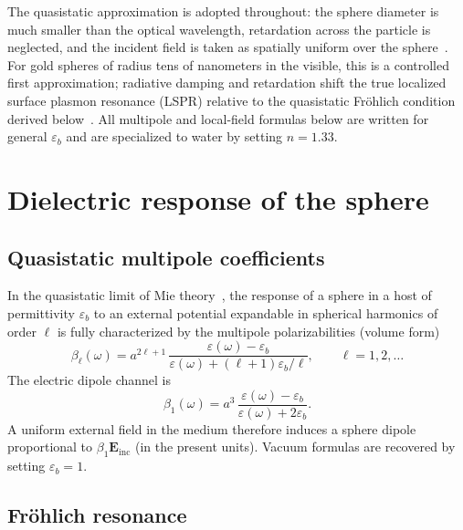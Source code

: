 \documentclass[11pt,a4paper]{article}
\begin{document}
\noindent
The quasistatic approximation is adopted throughout: the sphere diameter is much
smaller than the optical wavelength, retardation across the particle is neglected,
and the incident field is taken as spatially uniform over the sphere~\citep{bohren1983,novotny2012}.
For gold spheres of radius tens of nanometers in the visible, this is a controlled first
approximation; radiative damping and retardation shift the true localized surface
plasmon resonance (LSPR) relative to the quasistatic Fr\"{o}hlich condition derived
below~\citep{maier2007,bohren1983}.  All multipole and local-field formulas below are written for general
$\varepsilon_b$ and are specialized to water by setting $n=1.33$.

\section{Dielectric response of the sphere}
\label{sec:sphere}

\subsection{Quasistatic multipole coefficients}

In the quasistatic limit of Mie theory~\citep{mie1908,bohren1983}, the response of a sphere in a host of permittivity
$\varepsilon_b$ to an external potential expandable in spherical harmonics of
order $\ell$ is fully characterized by the multipole polarizabilities (volume form)
\begin{equation}
  \beta_\ell(\omega)
  =
  a^{2\ell+1}\,
  \frac{\varepsilon(\omega)-\varepsilon_b}{\varepsilon(\omega)+(\ell+1)\varepsilon_b/\ell},
  \qquad
  \ell = 1,2,\ldots
  \label{eq:beta}
\end{equation}
The electric dipole channel is
\begin{equation}
  \beta_1(\omega)
  =
  a^3\,
  \frac{\varepsilon(\omega)-\varepsilon_b}{\varepsilon(\omega)+2\varepsilon_b}.
  \label{eq:beta1}
\end{equation}
A uniform external field in the medium therefore induces a sphere dipole
proportional to $\beta_1\mathbf{E}_{\mathrm{inc}}$ (in the present units).
Vacuum formulas are recovered by setting $\varepsilon_b=1$.

\subsection{Fr\"{o}hlich resonance}
\end{document}
